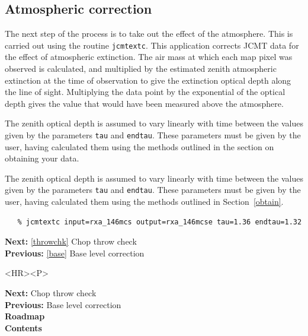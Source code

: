 \documentclass[11pt]{article}
\newenvironment{latexonly}{}{}
\newcommand{\htmlref}[2]{#1}
\newcommand{\xref}[3]{#1}
\newcommand{\xlabel}[1]{}
\begin{document}
\subsection{\label{extinct}\xlabel{extinct}Atmospheric correction}

   The next step of the process is to take out the effect of the
   atmosphere. This is carried out using the routine
{\tt \xref{jcmtextc}{sun132}{JCMTEXTC}}.
   This application corrects JCMT data for the effect of atmospheric
   extinction. The air mass at which each map pixel was observed is
   calculated, and multiplied by the estimated zenith atmospheric
   extinction at the time of observation to give the extinction optical
   depth along the line of sight. Multiplying the data point by the
   exponential of the optical depth gives the value that would have been
   measured above the atmosphere.

\begin{htmlonly}
   The zenith optical depth is assumed to
   vary linearly with time between the values given by the parameters
   {\tt tau} and {\tt endtau}. These parameters must be
   given by the user, having calculated them using the methods outlined
   in the section on
\htmlref{obtaining your data.}{obtain}
\end{htmlonly}
\begin{latexonly}
   The zenith optical depth is assumed to
   vary linearly with time between the values given by the parameters
   {\tt tau} and {\tt endtau}. These parameters must be
   given by the user, having calculated them using the methods outlined
   in
Section~\ref{obtain}.
\end{latexonly}

\begin{verbatim}
   % jcmtextc input=rxa_146mcs output=rxa_146mcse tau=1.36 endtau=1.32
\end{verbatim}

\begin{latexonly}
{\bf Next:} \ref{throwchk} Chop throw check\\
{\bf Previous:} \ref{base} Base level correction\\
\end{latexonly}

\begin{htmlonly}
\begin{rawhtml} <HR><P> \end{rawhtml}
{\bf \htmlref{Next:}{throwchk}} Chop throw check\\
{\bf \htmlref{Previous:}{base}} Base level correction\\
{\bf \htmlref{Roadmap}{roadmap}}\\
{\bf \htmlref{Contents}{stardoccontents}}\\
\end{htmlonly}
\end{document}
